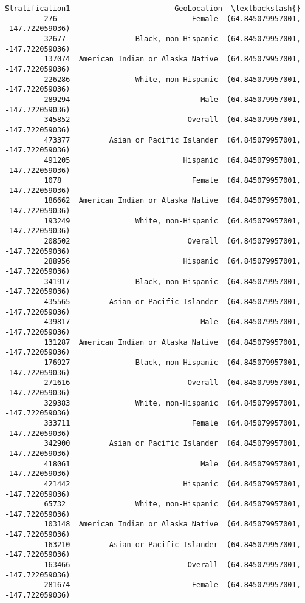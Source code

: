 \documentclass[11pt]{article}
\begin{document}
\begin{Verbatim}[commandchars=\\\{\}]
                                  Stratification1                        GeoLocation  \textbackslash{}
         276                               Female  (64.845079957001, -147.722059036)   
         32677                Black, non-Hispanic  (64.845079957001, -147.722059036)   
         137074  American Indian or Alaska Native  (64.845079957001, -147.722059036)   
         226286               White, non-Hispanic  (64.845079957001, -147.722059036)   
         289294                              Male  (64.845079957001, -147.722059036)   
         345852                           Overall  (64.845079957001, -147.722059036)   
         473377         Asian or Pacific Islander  (64.845079957001, -147.722059036)   
         491205                          Hispanic  (64.845079957001, -147.722059036)   
         1078                              Female  (64.845079957001, -147.722059036)   
         186662  American Indian or Alaska Native  (64.845079957001, -147.722059036)   
         193249               White, non-Hispanic  (64.845079957001, -147.722059036)   
         208502                           Overall  (64.845079957001, -147.722059036)   
         288956                          Hispanic  (64.845079957001, -147.722059036)   
         341917               Black, non-Hispanic  (64.845079957001, -147.722059036)   
         435565         Asian or Pacific Islander  (64.845079957001, -147.722059036)   
         439817                              Male  (64.845079957001, -147.722059036)   
         131287  American Indian or Alaska Native  (64.845079957001, -147.722059036)   
         176927               Black, non-Hispanic  (64.845079957001, -147.722059036)   
         271616                           Overall  (64.845079957001, -147.722059036)   
         329383               White, non-Hispanic  (64.845079957001, -147.722059036)   
         333711                            Female  (64.845079957001, -147.722059036)   
         342900         Asian or Pacific Islander  (64.845079957001, -147.722059036)   
         418061                              Male  (64.845079957001, -147.722059036)   
         421442                          Hispanic  (64.845079957001, -147.722059036)   
         65732                White, non-Hispanic  (64.845079957001, -147.722059036)   
         103148  American Indian or Alaska Native  (64.845079957001, -147.722059036)   
         163210         Asian or Pacific Islander  (64.845079957001, -147.722059036)   
         163466                           Overall  (64.845079957001, -147.722059036)   
         281674                            Female  (64.845079957001, -147.722059036)   

\end{Verbatim}
\end{document}
